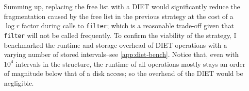 Summing up, replacing the free list with a DIET would significantly reduce the fragmentation caused by the free list in the previous strategy at the cost of a \(\log{r}\) factor during calls to \texttt{filter}; which is a reasonable trade-off given that \texttt{filter} will not be called frequently. To confirm the viability of the strategy, I benchmarked the runtime and storage overhead of DIET operations with a varying number of stored intervals--see \cref{app:diet-bench}. Notice that, even with \(10^4\) intervals in the structure, the runtime of all operations mostly stays an order of magnitude below that of a disk access; so the overhead of the DIET would be negligible.